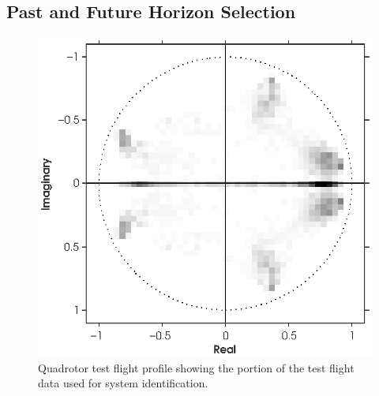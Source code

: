 \subsection{Past and Future Horizon Selection}
\begin{figure}[htb!]
	\centering
	\includegraphics{../fig/poles_parsim_all.eps}
	\caption{Quadrotor test flight profile showing the portion of the test flight data used for system identification.}
\end{figure}




